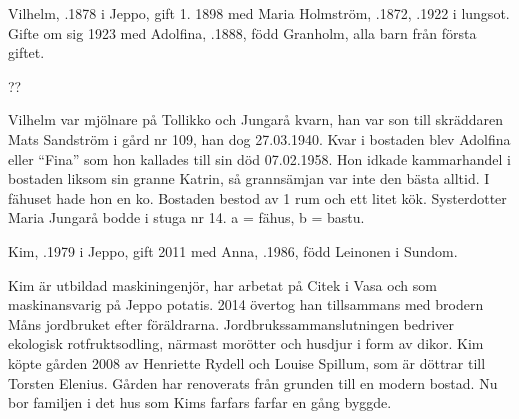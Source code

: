 Vilhelm, .1878 i Jeppo, gift 1. 1898 med Maria Holmström, .1872, .1922 i lungsot. Gifte om sig 1923 med Adolfina, .1888, född Granholm, alla barn från första giftet.
\begin{jhchildren}
  \item {}
  \item {}
  \item {}
  \item {}
  \item {} ??
  \item {}
\end{jhchildren}
Vilhelm var mjölnare på Tollikko och Jungarå kvarn, han var son till skräddaren Mats Sandström i gård nr 109, han dog 27.03.1940. Kvar i bostaden blev Adolfina eller ``Fina'' som hon kallades till sin död 07.02.1958. Hon idkade kammarhandel i bostaden liksom sin granne Katrin, så grannsämjan var inte den bästa alltid. I fähuset hade hon en ko. Bostaden bestod av 1 rum och ett litet kök. Systerdotter Maria Jungarå bodde i stuga nr 14. a = fähus, b = bastu.






Kim, .1979 i Jeppo, gift 2011 med Anna, .1986, född Leinonen i  Sundom.
\begin{jhchildren}
  \item {}
  \item {}
  \item {}
\end{jhchildren}

Kim är utbildad maskiningenjör, har arbetat på Citek i Vasa och som maskinansvarig på Jeppo potatis. 2014 övertog han tillsammans med brodern Måns jordbruket efter föräldrarna. Jordbrukssammanslutningen bedriver ekologisk rotfruktsodling, 	närmast morötter och husdjur i form av dikor. Kim köpte gården 2008 av Henriette Rydell och Louise Spillum, som är döttrar till Torsten Elenius. Gården har renoverats från grunden till en modern bostad. Nu bor familjen i det hus som Kims farfars farfar en gång byggde.


